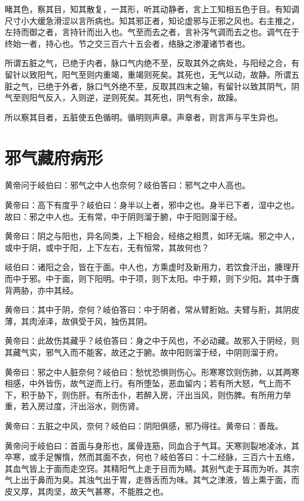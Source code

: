 \documentclass[a4paper,12pt,UTF8,twoside]{ctexbook}
\begin{document}
	睹其色，察其目，知其散复，一其形，听其动静者，言上工知相五色于目。有知调尺寸小大缓急滑涩以言所病也。知其邪正者，知论虚邪与正邪之风也。右主推之，左持而御之者，言持针而出入也。气至而去之者，言补泻气调而去之也。调气在于终始一者，持心也。节之交三百六十五会者，络脉之渗灌诸节者也。
	
	所谓五脏之气，已绝于内者，脉口气内绝不至，反取其外之病处，与阳经之合，有留针以致阳气，阳气至则内重竭，重竭则死矣。其死也，无气以动，故静。所谓五脏之气，已绝于外者，脉口气外绝不至，反取其四末之输，有留针以致其阴气，阴气至则阳气反入，入则逆，逆则死矣。其死也，阴气有余，故躁。
	
	所以察其目者，五脏使五色循明。循明则声章。声章者，则言声与平生异也。
	
	\chapter{邪气藏府病形}
	
	黄帝问于岐伯曰：邪气之中人也奈何？岐伯答曰：邪气之中人高也。
	
	黄帝曰：高下有度乎？岐伯曰：身半以上者，邪中之也。身半已下者，湿中之也。故曰：邪之中人也。无有常，中于阴则溜于腑，中于阳则溜于经。
	
	黄帝曰：阴之与阳也，异名同类，上下相会，经络之相贯，如环无端。邪之中人，或中于阴，或中于阳，上下左右，无有恒常，其故何也？
	
	岐伯曰：诸阳之会，皆在于面。中人也，方乘虚时及新用力，若饮食汗出，腠理开而中于邪。中于面，则下阳明。中于项，则下太阳。中于颊，则下少阳。其中于膺背两胁，亦中其经。
	
	黄帝曰：其中于阴，奈何？岐伯答曰：中于阴者，常从臂胻始。夫臂与胻，其阴皮薄，其肉淖泽，故俱受于风，独伤其阴。
	
	黄帝曰：此故伤其藏乎？岐伯答曰：身之中于风也，不必动藏。故邪入于阴经，则其藏气实，邪气入而不能客，故还之于腑。故中阳则溜于经，中阴则溜于府。
	
	黄帝曰：邪之中人脏奈何？岐伯曰：愁忧恐惧则伤心。形寒寒饮则伤肺，以其两寒相感，中外皆伤，故气逆而上行。有所堕坠，恶血留内；若有所大怒，气上而不下，积于胁下，则伤肝。有所击仆，若醉入房，汗出当风，则伤脾。有所用力举重，若入房过度，汗出浴水，则伤肾。
	
	黄帝曰：五脏之中风，奈何？岐伯曰：阴阳俱感，邪乃得往。黄帝曰：善哉。
	
	黄帝问于岐伯曰：首面与身形也，属骨连筋，同血合于气耳。天寒则裂地凌冰，其卒寒，或手足懈惰，然而其面不衣，何也？岐伯答曰：十二经脉，三百六十五络，其血气皆上于面而走空窍。其精阳气上走于目而为睛。其别气走于耳而为听。其宗气上出于鼻而为臭。其浊气出于胃，走唇舌而为味。其气之津液，皆上熏于面，而皮又厚，其肉坚，故天气甚寒，不能胜之也。
	
\end{document}
